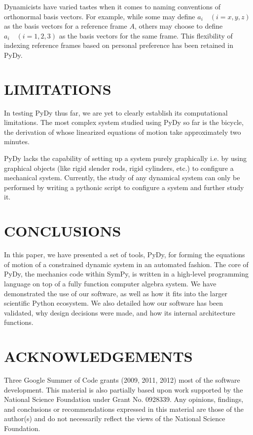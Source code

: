 \documentclass[twocolumn,10pt]{asme2e}
\begin{document}
Dynamicists have varied tastes when it comes to naming conventions of
orthonormal basis vectors. For example, while some may define $a_i
\quad (i=x,y,z)$ as the basis vectors for a reference frame $A$, others may
choose to define $a_i \quad (i=1,2,3)$ as the basis vectors for the same frame.
This flexibility of indexing reference frames based on personal preference has
been retained in PyDy.

\section*{LIMITATIONS}
In testing PyDy thus far, we are yet to clearly establish its computational
limitations. The most complex system studied using PyDy so far is the bicycle,
the derivation of whose linearized equations of motion take approximately
two minutes.

PyDy lacks the capability of setting up a system purely graphically i.e. by
using graphical objects (like rigid slender rods, rigid cylinders, etc.) to
configure a mechanical system. Currently, the study of any dynamical system
can only be performed by writing a pythonic script to configure a system and
further study it.


\section*{CONCLUSIONS}
In this paper, we have presented a set of tools, PyDy, for forming the
equations of motion of a constrained dynamic system in an automated fashion.
The core of PyDy, the mechanics code within SymPy, is written in a high-level
programming language on top of a fully function computer algebra system.
We have demonstrated the use of our software, as well as how it fits into the
larger scientific Python ecosystem.
We also detailed how our software has been validated, why design decisions were
made, and how its internal architecture functions.

\section*{ACKNOWLEDGEMENTS}
Three Google Summer of Code grants (2009, 2011, 2012) most of the software
development. This material is also partially based upon work supported by the
National Science Foundation under Grant No. 0928339. Any opinions, findings,
and conclusions or recommendations expressed in this material are those of the
author(s) and do not necessarily reflect the views of the National Science
Foundation.


\end{document}
